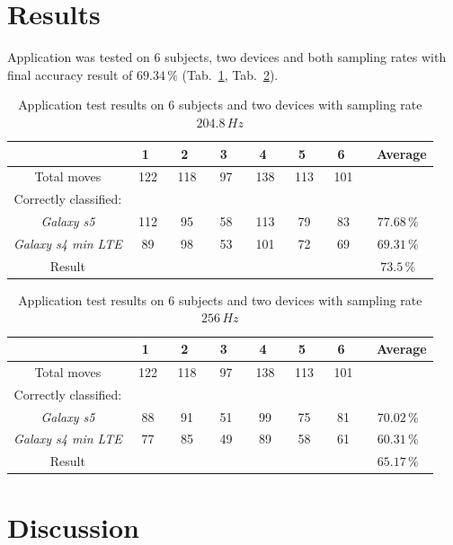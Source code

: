 \documentclass[conference]{IEEEtran}
\begin{document}
\section{Results}

Application was tested on 6 subjects, two devices and both sampling rates with final accuracy result of $69.34\,\%$ (Tab.~\ref{Results204}, Tab.~\ref{Results256}).

\begin{table}[h!]
	\caption{Application test results on 6 subjects and two devices with sampling rate $204.8\,Hz$}
	\begin{center}
		\begin{tabular}{c|cccccc|c}
			& \ 1 \ &\ 2 \ &\ 3 \ &\ 4 \ &\ 5 \ &\ 6 \ &\ Average\\
			\hline
			Total moves&122&118&97&138&113&101\\
			\hline
			Correctly classified:&&&&&&\\
			\emph{Galaxy s5}&112&95&58&113&79&83&$77.68\,\%$\\
			\emph{Galaxy s4 min LTE}&89&98&53&101&72&69&$69.31\,\%$\\
			\hline
		    Result&&&&&&&$73.5\,\%$
		\end{tabular}
		\label{Results204}
	\end{center}
\end{table}

\begin{table}[h!]
	\caption{Application test results on 6 subjects and two devices with sampling rate $256\,Hz$}
	\begin{center}
		\begin{tabular}{c|cccccc|c}
			& \ 1 \ &\ 2 \ &\ 3 \ &\ 4 \ &\ 5 \ &\ 6 \ &\ Average\\
			\hline
			Total moves&122&118&97&138&113&101\\
			\hline
			Correctly classified:&&&&&&\\
			\emph{Galaxy s5}&88&91&51&99&75&81&$70.02\,\%$\\
			\emph{Galaxy s4 min LTE}&77&85&49&89&58&61&$60.31\,\%$\\
			\hline
		    Result&&&&&&&$65.17\,\%$
		\end{tabular}
		\label{Results256}
	\end{center}
\end{table}

\section{Discussion}
\end{document}
